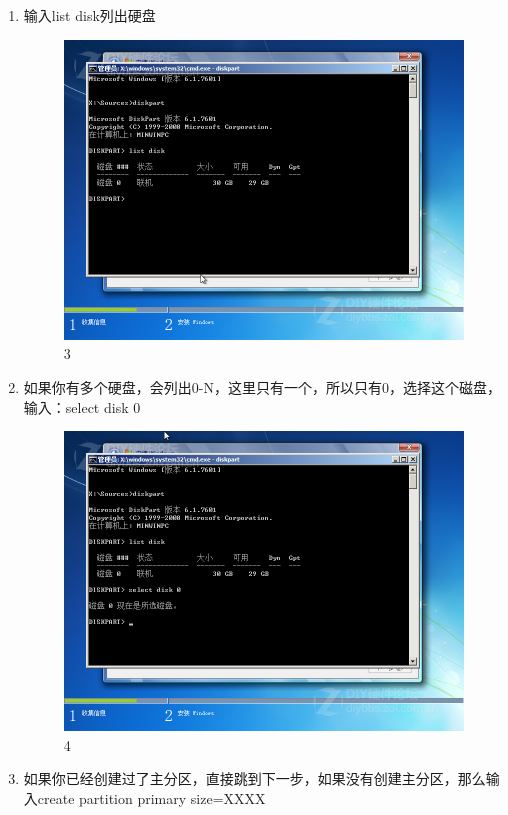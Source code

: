 \documentclass[a4paper,12pt]{article}
\numberwithin{equation}{section}%
\begin{document}
\begin{enumerate}
\item 输入list disk列出硬盘
  
 \begin{figure}[!ht]
  \centering\includegraphics[width=5in]{3.png}
 \caption{3}
  \end{figure}\newpage

\item 如果你有多个硬盘，会列出0-N，这里只有一个，所以只有0，选择这个磁盘，输入：select disk 0

 \begin{figure}[!ht]
  \centering\includegraphics[width=5in]{4.png}
 \caption{4}
  \end{figure} \newpage

\item 如果你已经创建过了主分区，直接跳到下一步，如果没有创建主分区，那么输入create partition primary size=XXXX


\end{enumerate}
\end{document}
